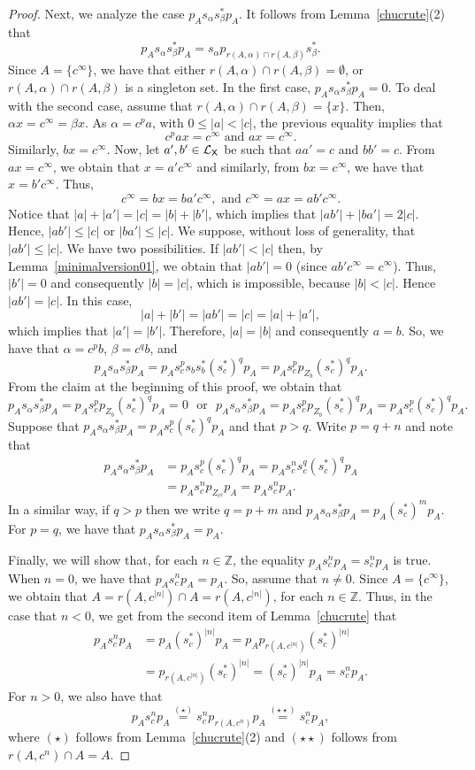 \documentclass[a4paper,12pt]{amsart}
\theoremstyle{definition}
\theoremstyle{remark}
\numberwithin{equation}{section}
\newcommand{\osf}{{\normalfont \textsf{X}}}
\newcommand{\lang}{\CL_{\osf}}
\newcommand{\Z}{\mathbb{Z}}
\newcommand{\CL}{\mathcal{L}}
\begin{document}
\begin{proof}
Next, we analyze the case $p_As_\alpha s_\beta^* p_A$. It follows from Lemma~\ref{chucrute}(2) that 
$$p_As_\alpha s_\beta^* p_A=s_\alpha p_{r(A,\alpha)\cap r(A,\beta)}s_\beta^*.$$ Since $A=\{c^\infty\}$, we have that either $r(A,\alpha)\cap r(A,\beta)=\emptyset$,  or $r(A,\alpha)\cap r(A,\beta)$ is a singleton set. In the first case, $p_As_\alpha s_\beta^*p_A=0$. To deal with the second case, assume that $r(A,\alpha)\cap r(A,\beta)=\{x\}$. 
Then, $\alpha x=c^\infty=\beta x$. As $\alpha =c^p a$, with $0\leq |a|<|c|$, the previous equality implies that 
$$c^p a x=c^\infty \text{ and } ax=c^\infty.$$
Similarly, $bx=c^\infty$. Now, let $a',b'\in \lang$ be such that $aa'=c$ and $bb'=c$. From $ax=c^\infty$, we obtain that $x=a'c^\infty$ and similarly, from $bx=c^\infty$, we have that $x=b'c^\infty$. Thus,
$$c^\infty=bx=ba' c^\infty, \text{ and } c^\infty=ax=ab'c^\infty.$$
Notice that $|a|+|a'|=|c|=|b|+|b'|$, which implies that $|ab'|+|ba'|=2|c|$. Hence, $|ab'|\leq |c|$ or $|ba'|\leq |c|$. We suppose, without loss of generality, that $|ab'|\leq |c|$. We have two possibilities. If $|ab'|<|c|$ then, by Lemma~\ref{minimalversion01}, we obtain that $|ab'|=0$ (since $ab'c^\infty=c^\infty$). Thus, $|b'|=0$ and consequently $|b|=|c|$, which is impossible, because $|b|<|c|$. Hence $|ab'|=|c|$. In this case, $$|a|+|b'|=|ab'|=|c|=|a|+|a'|,$$ 
which implies that $|a'|=|b'|$. Therefore, $|a|=|b|$ and consequently $a=b$. So, we have that  $\alpha=c^pb$, $\beta=c^qb$, and 
$$p_A s_\alpha s_\beta^*p_A=p_A s_c^ps_bs_b^*(s_c^*)^qp_A=p_A s_c^pp_{Z_b}(s_c^*)^qp_A.$$
From the claim at the beginning of this proof, we obtain that  
$$p_A s_\alpha s_\beta^*p_A=p_A s_c^pp_{Z_b}(s_c^*)^qp_A=0 \,\,\text{ or }\,\, p_A s_\alpha s_\beta^*p_A=p_A s_c^pp_{Z_b}(s_c^*)^qp_A=p_A s_c^p(s_c^*)^qp_A.$$ 
Suppose that $p_A s_\alpha s_\beta^*p_A=p_A s_c^p(s_c^*)^qp_A$ and that $p>q$. Write $p=q+n$ and note that 
\begin{align*}
    p_A s_\alpha s_\beta^*p_A&=p_A s_c^p(s_c^*)^qp_A=p_A s_c^ns_c^q (s_c^*)^qp_A\\
    &=p_A s_c^np_{Z_{c^q}}p_A=p_As_c^np_A.
\end{align*}
In a similar way, if $q>p$ then we write $q=p+m$ and $p_A s_\alpha s_\beta^*p_A=p_A(s_c^*)^mp_A$. For $p=q$, we have that $p_A s_\alpha s_\beta^*p_A=p_A$. \smallbreak

Finally, we will show that, for each $n\in \Z$, the equality $p_A s_c^np_A=s_c^np_A$ is true. When $n=0$, we have that $p_A s_c^np_A=p_A$. So, assume that $n\neq 0$. Since $A=\{c^\infty\}$, we obtain that $A=r(A,c^{|n|})\cap A=r(A, c^{|n|})$, for each $n\in \Z$. Thus, in the case that $n<0$, we get from the second item of Lemma~\ref{chucrute} that 
\begin{align*}
    p_A s_c^n p_A&=p_A (s_c^*)^{|n|}p_A= p_A p_{r(A,c^{|n|})}(s_c^*)^{|n|}\\
    &=p_{r(A, c^{|n|})}(s_c^*)^{|n|}=(s_c^*)^{|n|}p_A=s_c^n p_A.
\end{align*}
For $n>0$, we also have that $$p_A s_c^n p_A\stackrel{(\star)}{=}s_c^n p_{r(A,c^n)}p_A\stackrel{(\star\star)}{=}s_c^n p_A,$$ where $(\star)$ follows from Lemma~\ref{chucrute}(2) and $(\star\star)$ follows from $r(A,c^n) \cap A=A$.
\end{proof}
\end{document}
